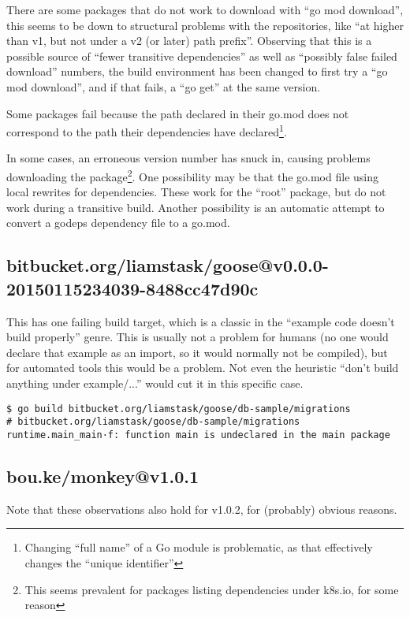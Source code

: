 \documentclass[a4paper]{paper}
\begin{document}
There are some packages that do not work to download with ``go mod
download'', this seems to be down to structural problems with the
repositories, like ``at higher than v1, but not under a v2 (or later)
path prefix''. Observing that this is a possible source of ``fewer
transitive dependencies'' as well as ``possibly false failed
download'' numbers, the build environment has been changed to first
try a ``go mod download'', and if that fails, a ``go get'' at the same
version.

Some packages fail because the path declared in their go.mod does not
correspond to the path their dependencies have
declared\footnote{Changing ``full name'' of a Go module is
  problematic, as that effectively changes the ``unique identifier''}.

In some cases, an erroneous version number has snuck in, causing
problems downloading the package\footnote{This seems prevalent for
  packages listing dependencies under k8s.io, for some reason}. One
possibility may be that the go.mod file using local rewrites for
dependencies. These work for the ``root'' package, but do not work
during a transitive build. Another possibility is an automatic attempt
to convert a godeps dependency file to a go.mod.

\subsection{bitbucket.org/liamstask/goose@v0.0.0-20150115234039-8488cc47d90c}

This has one failing build target, which is a classic in the ``example
code doesn't build properly'' genre. This is usually not a problem for
humans (no one would declare that example as an import, so it would
normally not be compiled), but for automated tools this would be a
problem. Not even the heuristic ``don't build anything under
example/...'' would cut it in this specific case.

\begin{verbatim}
$ go build bitbucket.org/liamstask/goose/db-sample/migrations
# bitbucket.org/liamstask/goose/db-sample/migrations
runtime.main_main·f: function main is undeclared in the main package
\end{verbatim}

\subsection{bou.ke/monkey@v1.0.1}

Note that these observations also hold for v1.0.2, for (probably) obvious reasons.
\end{document}
